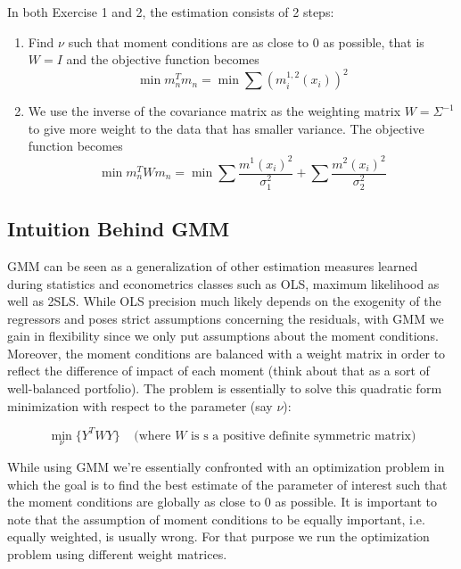 In both Exercise 1 and 2, the estimation consists of 2 steps:
\begin{enumerate}
\item Find $\nu$ such that moment conditions are as close to 0 as possible, that is $W=I$ and the objective function becomes 
\begin{equation*}
\min m_n^Tm_n = \min \sum \left(m_i^{1,2}(x_i)\right)^2
\end{equation*}
\item We use the inverse of the covariance matrix as the weighting matrix $W=\Sigma^{-1}$ to give more weight to the data that has smaller variance. The objective function becomes 
\begin{equation*}
\min m_n^TWm_n = \min \sum \frac{m^1(x_i)^2}{\sigma_1^2}+ \sum \frac{m^2(x_i)^2}{\sigma_2^2}
\end{equation*}
\end{enumerate}
\subsection*{Intuition Behind GMM}
GMM can be seen as a generalization of other estimation measures learned during statistics and econometrics classes such as OLS, maximum likelihood as well as 2SLS. While OLS precision much likely depends on the exogenity of the regressors and poses strict assumptions concerning the residuals, with GMM we gain in flexibility since we only put assumptions about the moment conditions. Moreover, the moment conditions are balanced with a weight matrix in order to reflect the difference of impact of each moment (think about that as a sort of well-balanced portfolio). The problem is essentially to solve this quadratic form minimization with respect to the parameter (say $\nu$):

\begin{equation*}
    \min_\nu \{Y^T WY\} \;\;\;\;\text{(where $W$ is s a positive definite symmetric matrix)}
\end{equation*}

\noindent 
While using GMM we’re essentially confronted with an optimization problem in which the goal is to find the best estimate of the parameter of interest such that the moment conditions are globally as close to 0 as possible. It is important to note that the assumption of moment conditions to be equally important, i.e. equally weighted, is usually wrong. For that purpose we run the optimization problem using different weight matrices.


